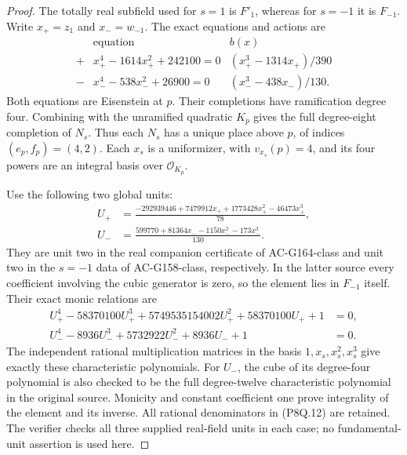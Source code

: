 \begin{proof}
The totally real subfield used for $s=1$ is $F'_1$,
whereas for $s=-1$ it is $F_{-1}$.
Write $x_+=z_1$ and $x_-=w_{-1}$.
The exact equations and actions are
\[
 \begin{array}{c|c|c}
 &\text{equation}&b(x)\\ \hline
 +&x_+^4-1614x_+^2+242100=0&
                   (x_+^3-1314x_+)/390\\
 -&x_-^4-538x_-^2+26900=0&
                   (x_-^3-438x_-)/130 .
 \end{array}
 \tag{P8Q.11}
\]
Both equations are Eisenstein at $p$.
Their completions have ramification degree four.
Combining with the unramified quadratic $K_p$ gives the
full degree-eight completion of $N_s$.
Thus each $N_s$ has a unique place above $p$, of indices
$(e_p,f_p)=(4,2)$.
Each $x_s$ is a uniformizer, with $v_{x_s}(p)=4$,
and its four powers are an integral basis over
$\mathcal O_{K_p}$.

Use the following two global units:
\[
 \begin{aligned}
 U_+&=\frac{-292939446+7479912x_+
                         +1773428x_+^2-46473x_+^3}{78},\\
 U_-&=\frac{599770+81364x_-
                            -1150x_-^2-173x_-^3}{130}.
 \end{aligned}
 \tag{P8Q.12}
\]
They are unit two in the real companion certificate of
AC-G164-class and unit two in the $s=-1$ data of
AC-G158-class, respectively.
In the latter source every coefficient involving the cubic
generator is zero, so the element lies in $F_{-1}$ itself.
Their exact monic relations are
\[
 \begin{aligned}
 U_+^4-58370100U_+^3+5749535154002U_+^2
                                  +58370100U_++1&=0,\\
 U_-^4-8936U_-^3+5732922U_-^2+8936U_-+1&=0.
 \end{aligned}
 \tag{P8Q.13}
\]
The independent rational multiplication matrices in the basis
$1,x_s,x_s^2,x_s^3$ give exactly these characteristic
polynomials.
For $U_-$, the cube of its degree-four polynomial is also
checked to be the full degree-twelve characteristic polynomial
in the original source.
Monicity and constant coefficient one prove integrality of
the element and its inverse.
All rational denominators in (P8Q.12) are retained.
The verifier checks all three supplied real-field units in
each case; no fundamental-unit assertion is used here.


\end{proof}
